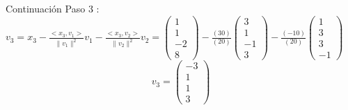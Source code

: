 \documentclass[11pt]{beamer}
\begin{document}
\begin{frame}{Continuación}
    Paso 3 : $ v_3 = x_3 - \frac{<x_3,v_1>}{\parallel v_1 \parallel ^2} v_1 - \frac{<x_3,v_2>}{\parallel v_2 \parallel ^2} v_2  = \begin{pmatrix}
        1 \\ 1 \\ -2 \\ 8
    \end{pmatrix} - \frac{(30)}{(20)} \begin{pmatrix}
        3 \\ 1 \\ -1 \\ 3 
    \end{pmatrix} - \frac{(-10)}{(20)} \begin{pmatrix}
        1 \\ 3 \\ 3 \\ -1 
    \end{pmatrix}$
    \begin{equation*}
         v_3 =\begin{pmatrix}
         -3 \\ 1 \\ 1 \\ 3
     \end{pmatrix} 
     \end{equation*}

\end{frame}
\end{document}
